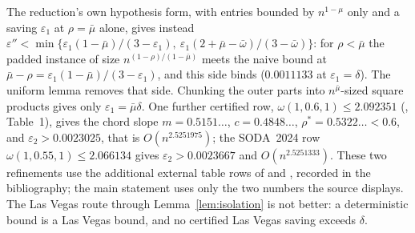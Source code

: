 \documentclass[11pt]{article}
\begin{document}
The reduction's own hypothesis form, with entries bounded by $n^{1-\mu}$
only and a saving $\varepsilon_1$ at $\rho=\bar\mu$ alone, gives instead
$\varepsilon''<\min\{\varepsilon_1(1-\bar\mu)/(3-\varepsilon_1),\
\varepsilon_1(2+\bar\mu-\bar\omega)/(3-\bar\omega)\}$: for $\rho<\bar\mu$
the padded instance of size $n^{(1-\rho)/(1-\bar\mu)}$ meets the naive
bound at $\bar\mu-\rho=\varepsilon_1(1-\bar\mu)/(3-\varepsilon_1)$, and
this side binds ($0.0011133$ at $\varepsilon_1=\delta$). The uniform lemma
removes that side. Chunking the outer parts into $n^{\bar\mu}$-sized square
products gives only $\varepsilon_1=\bar\mu\delta$. One further certified
row, $\omega(1,0.6,1)\le2.092351$ (\cite{ADVXXZ25}, Table~1), gives the chord slope
$m=0.5151\ldots$, $c=0.4848\ldots$, $\rho^*=0.5322\ldots<0.6$, and
$\varepsilon_2>0.0023025$, that is $O(n^{2.5251975})$; the SODA~2024 row
$\omega(1,0.55,1)\le2.066134$ gives $\varepsilon_2>0.0023667$ and
$O(n^{2.5251333})$. These two refinements use the additional external table rows of
\cite{ADVXXZ25} and \cite{VXXZ24}, recorded in the bibliography; the main
statement uses only the two numbers the source displays. The Las Vegas route through Lemma~\ref{lem:isolation} is not
better: a deterministic bound is a Las Vegas bound, and no certified Las
Vegas saving exceeds $\delta$.

\end{document}
